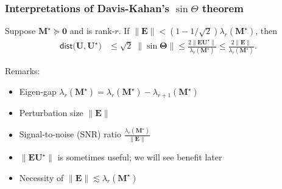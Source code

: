 \documentclass[compress,
mathserif,wide,%
]{beamer}
\begin{document}
\begin{frame}
	\frametitle{Interpretations of Davis-Kahan's $\sin\Theta$ theorem}
	
{

\begin{varblock}[\textwidth]{}
Suppose $\bm{M}^\star \succeq \bm{0}$ and is rank-$r$. If $\|\bm{E}\| < (1 - 1/ \sqrt{2}) \lambda_{r}(\bm{M}^\star)$, then
\begin{subequations}
\label{eq:davis-kahan-conclusion-corollary}
\begin{align*}
\mathsf{dist}\big(\bm{U},\bm{U}^{\star}\big) & \leq\sqrt{2}\;\|\sin\bm{\Theta}\|\leq\frac{2 \big\|\bm{E}\bm{U}^{\star}\big\|}{\lambda_{r}(\bm{M}^\star)}\leq\frac{2\|\bm{E}\|}{\lambda_{r}(\bm{M}^\star)}.
\end{align*}
\end{subequations}
\end{varblock}
}


\vfill 
Remarks: 
	\begin{itemize}
	\itemsep0.5em
	\item Eigen-gap $\lambda_{r}(\bm{M}^{\star}) = \lambda_{r}(\bm{M}^{\star}) - \lambda_{r+1}(\bm{M}^{\star})$
	\item Perturbation size $\|\bm{E}\|$
	\item Signal-to-noise (SNR) ratio $\frac{\lambda_{r}(\bm{M}^\star)}{\|\bm{E}\|}$
	\item $\|\bm{E} \bm{U}^{\star} \|$ is sometimes useful; we will see benefit later
	\item Necessity of $\|\bm{E}\| \lesssim \lambda_{r}(\bm{M}^\star)$
\end{itemize}
\end{frame}
\end{document}
